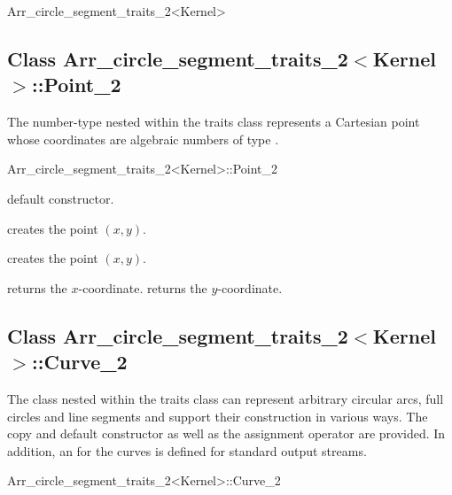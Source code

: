 \begin{ccRefClass}{Arr_circle_segment_traits_2<Kernel>}
\subsection*{Class 
Arr\_circle\_segment\_traits\_2$<$Kernel$>$::Point\_2}

The  number-type nested within the traits class represents
a Cartesian point whose coordinates are algebraic numbers of type
.

\begin{ccClass}{Arr_circle_segment_traits_2<Kernel>::Point_2}

\ccTypes



\ccCreation
{}

    {default constructor.}

    {creates the point $(x,y)$.}

    {creates the point $(x,y)$.}

\ccAccessFunctions

  {returns the $x$-coordinate.}
\ccGlue
{}
  {returns the $y$-coordinate.}

\end{ccClass}

\subsection*{Class 
        Arr\_circle\_segment\_traits\_2$<$Kernel$>$::Curve\_2}

The  class nested within the traits class can represent
arbitrary circular arcs, full circles and line segments and support their
construction in various ways.
The copy and default constructor as well as the assignment operator are
provided. In addition, an  for the curves is defined for
standard output streams.

\begin{ccClass}{Arr_circle_segment_traits_2<Kernel>::Curve_2}


\end{ccClass}
\end{ccRefClass}

